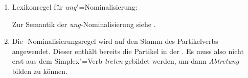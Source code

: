 \begin{enumerate}
\item

\eas
Lexikonregel für \emph{ung}"=Nominalisierung:\\
\label{lr-ung-nom}%
\zs

Zur Semantik der \emph{ung}-Nominalisierung siehe .

\item Die -Nominalisierungsregel wird auf den Stamm des Partikelverbs angewendet. Dieser
  enthält bereits die Partikel in der \subcatl. Es muss also nicht erst aus dem Simplex"=Verb
  \emph{treten}  gebildet werden, um dann \emph{Abtretung} bilden zu können.

\end{enumerate}
